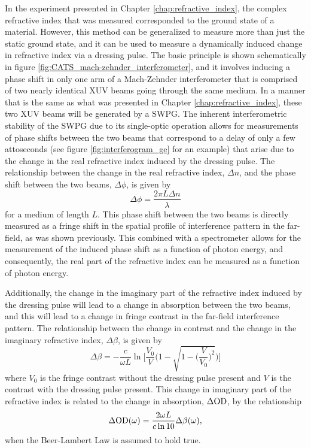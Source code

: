 In the experiment presented in Chapter \ref{chap:refractive_index}, the complex refractive index that was measured corresponded to the ground state of a material.  However, this method can be generalized to measure more than just the static ground state, and it can be used to measure a dynamically induced change in refractive index via a dressing pulse.  The basic principle is shown schematically in figure \ref{fig:CATS_mach-zehnder_interferometer}, and it involves inducing a phase shift in only one arm of a Mach-Zehnder interferometer that is comprised of two nearly identical XUV beams going through the same medium. In a manner that is the same as what was presented in Chapter \ref{chap:refractive_index}, these two XUV beams will be generated by a SWPG.  The inherent interferometric stability of the SWPG due to its single-optic operation allows for measurements of phase shifts between the two beams that correspond to a delay of only a few attoseconds (see figure \ref{fig:interferogram_ge} for an example) that arise due to the change in the real refractive index induced by the dressing pulse.  The relationship between the change in the real refractive index, $\Delta n$, and the phase shift between the two beams, $\Delta\phi$, is given by
\begin{equation}
	\label{eqn:phase_shift_dn}
	\Delta \phi = \frac{2\pi L \Delta n}{\lambda}
\end{equation}
for a medium of length $L$.  This phase shift between the two beams is directly measured as a fringe shift in the spatial profile of interference pattern in the far-field, as was shown previously. This combined with a spectrometer allows for the measurement of the induced phase shift as a function of photon energy, and consequently, the real part of the refractive index can be measured as a function of photon energy.  

Additionally, the change in the imaginary part of the refractive index induced by the dressing pulse will lead to a change in absorption between the two beams, and this will lead to a change in fringe contrast in the far-field interference pattern.  The relationship between the change in contrast and the change in the imaginary refractive index, $\Delta \beta$,  is given by
\begin{equation}
	\label{eqn:beta_fringe_contrast_chap_cats}
	\Delta\beta = -\frac{c}{\omega L} \ln\Bigg[\frac{V_0}{V}\Bigg(1-\sqrt{1-\bigg(\frac{V}{V_0}\bigg)^2}\Bigg)\Bigg]
\end{equation}
where $V_0$ is the fringe contrast without the dressing pulse present and $V$ is the contrast with the dressing pulse present.  This change in imaginary part of the refractive index is related to the change in absorption, $\Delta\mathrm{OD}$, by the relationship
\begin{equation}
	\label{eqn:dod_to_beta}
	\Delta\mathrm{OD}(\omega) = \frac{2 \omega L}{c \ln 10}\Delta \beta(\omega),
\end{equation}
when the Beer-Lambert Law is assumed to hold true. 

